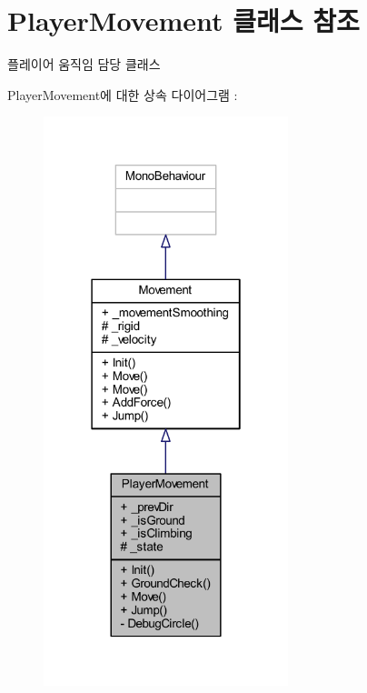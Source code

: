 \hypertarget{class_player_movement}{}\section{Player\+Movement 클래스 참조}
\label{class_player_movement}


플레이어 움직임 담당 클래스  




Player\+Movement에 대한 상속 다이어그램 \+: \nopagebreak
\begin{figure}[H]
\begin{center}
\leavevmode
\includegraphics[width=202pt]{de/d46/class_player_movement__inherit__graph}
\end{center}
\end{figure}


